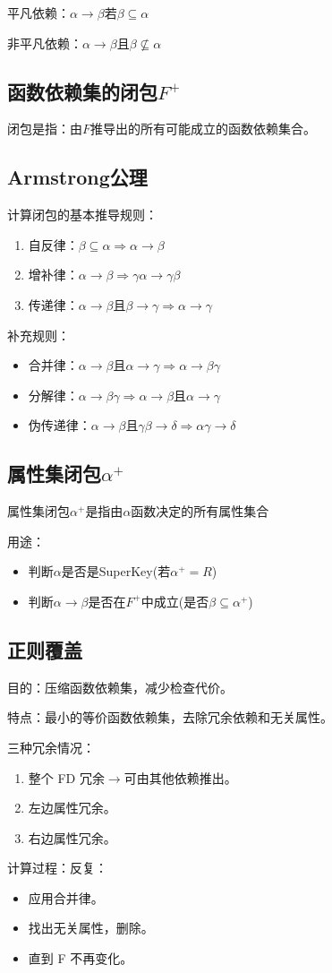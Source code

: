 平凡依赖：$\alpha\to\beta$若$\beta\subseteq \alpha$

非平凡依赖：$\alpha\to\beta$且$\beta\nsubseteq\alpha$

\subsection{函数依赖集的闭包$F^+$}

闭包是指：由$F$推导出的所有可能成立的函数依赖集合。

\subsection{Armstrong公理}

计算闭包的基本推导规则：
\begin{enumerate}
    \item 自反律：$\beta\subseteq\alpha\Longrightarrow\alpha\to\beta$
    \item 增补律：$\alpha\to\beta\Longrightarrow\gamma\alpha\to\gamma\beta$
    \item 传递律：$\alpha\to\beta$且$\beta\to\gamma\Longrightarrow\alpha\to\gamma$
\end{enumerate}

补充规则：
\begin{itemize}
    \item 合并律：$\alpha\to\beta$且$\alpha\to\gamma\Longrightarrow\alpha\to\beta\gamma$
    \item 分解律：$\alpha\to\beta\gamma\Longrightarrow\alpha\to\beta$且$\alpha\to\gamma$
    \item 伪传递律：$\alpha\to\beta$且$\gamma\beta\to\delta\Longrightarrow\alpha\gamma\to\delta$
\end{itemize}

\subsection{属性集闭包$\alpha^+$}

属性集闭包$\alpha^+$是指由$\alpha$函数决定的所有属性集合

用途：
\begin{itemize}
    \item 判断$\alpha$是否是SuperKey(若$\alpha^+=R$)
    \item 判断$\alpha\to\beta$是否在$F^+$中成立(是否$\beta\subseteq\alpha^+$)
\end{itemize}

\subsection{正则覆盖}

目的：压缩函数依赖集，减少检查代价。

特点：最小的等价函数依赖集，去除冗余依赖和无关属性。

三种冗余情况：
\begin{enumerate}
    \item 整个 FD 冗余$\to$可由其他依赖推出。
    \item 左边属性冗余。
    \item 右边属性冗余。
\end{enumerate}

计算过程：反复：
\begin{itemize}
    \item 应用合并律。
    \item 找出无关属性，删除。
    \item 直到 F 不再变化。
\end{itemize}